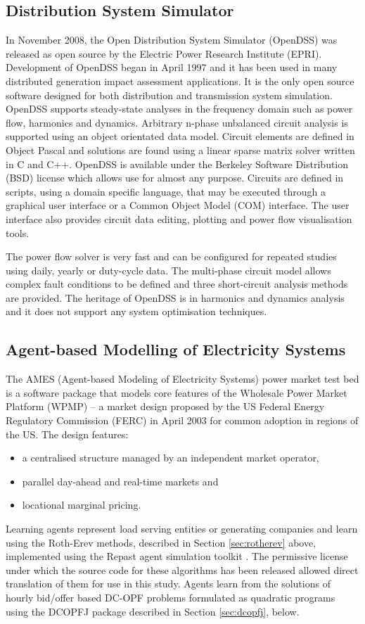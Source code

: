 \subsection{Distribution System Simulator}
In November 2008, the Open Distribution System Simulator (OpenDSS) was released
as open source by the Electric Power Research Institute (EPRI).  Development of
OpenDSS began in April 1997 and it has been used in many distributed generation
impact assessment applications.  It is the only open source software designed
for both distribution and transmission system simulation.  OpenDSS supports
steady-state analyses in the frequency domain such as power flow, harmonics and
dynamics.  Arbitrary n-phase unbalanced circuit analysis is supported using an
object orientated data model.  Circuit elements are defined in Object Pascal
and solutions are found using a linear sparse matrix solver written in C and
C++.  OpenDSS is available under the Berkeley Software Distribution (BSD)
license which allows use for almost any purpose.  Circuits are defined in
scripts, using a domain specific language, that may be executed through a
graphical user interface or a Common Object Model (COM) interface.  The user
interface also provides circuit data editing, plotting and power flow
visualisation tools.

The power flow solver is very fast and can be configured for repeated studies
using daily, yearly or duty-cycle data.  The multi-phase circuit model allows
complex fault conditions to be defined and three short-circuit analysis methods
are provided.  The heritage of OpenDSS is in harmonics and dynamics analysis
and it does not support any system optimisation techniques.

\subsection{Agent-based Modelling of Electricity Systems}
\label{sec:ames}
The AMES (Agent-based Modeling of Electricity Systems) power market test bed is
a software package that models core features of the Wholesale Power Market
Platform (WPMP) -- a market design proposed by the US Federal Energy Regulatory
Commission (FERC) in April 2003 for common adoption in regions of the
US\cite{tesfatsi:wpmp}. The design features:
\begin{itemize}
  \item a centralised structure managed by an independent market operator,
  \item parallel day-ahead and real-time markets and
  \item locational marginal pricing.
\end{itemize}
Learning agents represent load serving entities or generating companies and
learn using the Roth-Erev methods, described in Section \ref{sec:rotherev}
above, implemented using the Repast agent simulation toolkit
\cite{gieseler:thesis}.  The permissive license under which the source code for
these algorithms has been released allowed direct translation of them for use
in this study.  Agents learn from the solutions of hourly bid/offer based
DC-OPF problems formulated as quadratic programs using the DCOPFJ package
\cite{tesfatsi:dcopf} described in Section \ref{sec:dcopfj}, below.

